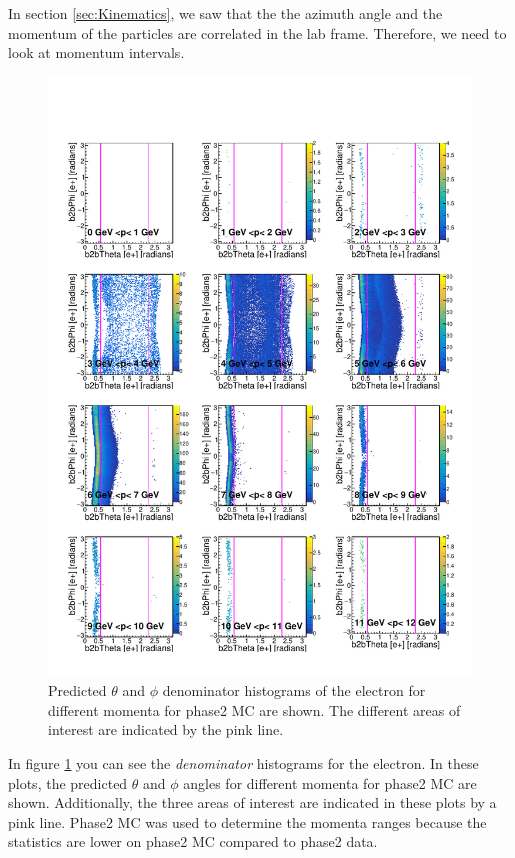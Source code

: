 \documentclass[a4paper,11pt,twosided,final,german,openbib,pdftex,listof=totoc,bibliography=totoc]{scrbook}
\begin{document}
In section \ref{sec:Kinematics}, we saw that the the azimuth angle and the momentum of the particles are correlated in the lab frame. Therefore, we need to look at momentum intervals. 

\begin{figure}[h!]
	\includegraphics[width=\textwidth]{Plots/master/RTPMemD_MC.pdf}
	\caption[Denominator $\theta$-$\phi$ Electron Momentum MC]{Predicted $\theta$ and $\phi$ denominator histograms of the electron for different momenta for phase2 MC are shown. The different areas of interest are indicated by the pink line.}
	\label{plt:RTPMemD_MC}
\end{figure}

In figure \ref{plt:RTPMemD_MC} you can see the \textit{denominator} histograms for the electron. In these plots, the predicted $\theta$ and $\phi$ angles for different momenta for phase2 MC are shown. Additionally, the three areas of interest are indicated in these plots by a pink line. Phase2 MC was used to determine the momenta ranges because the statistics are lower on phase2 MC compared to phase2 data. 
\end{document}
